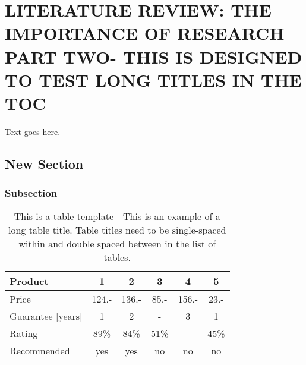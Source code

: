 %
%
%


\chapter{\uppercase {Literature Review: The Importance of Research Part Two- This is designed to test long titles in the TOC}}

Text goes here.

\section{New Section}
\subsection{Subsection}
\begin{table}[H]
\centering
\caption{This is a table template - This is an example of a long table title.  Table titles need to be single-spaced within and double spaced between in the list of tables.}
\begin{tabular}{|l|c|c|c|c|c|}
\hline
Product & 1 & 2 & 3 & 4 & 5\\
\hline
Price & 124.- & 136.- & 85.- & 156.- & 23.-\\
Guarantee [years] & 1 & 2 & - & 3 & 1\\
Rating & 89\% & 84\% & 51\% & & 45\%\\
\hline
\hline
Recommended & yes & yes & no & no & no\\
\hline
\end{tabular}
\label{tab:template1}
\end{table}


